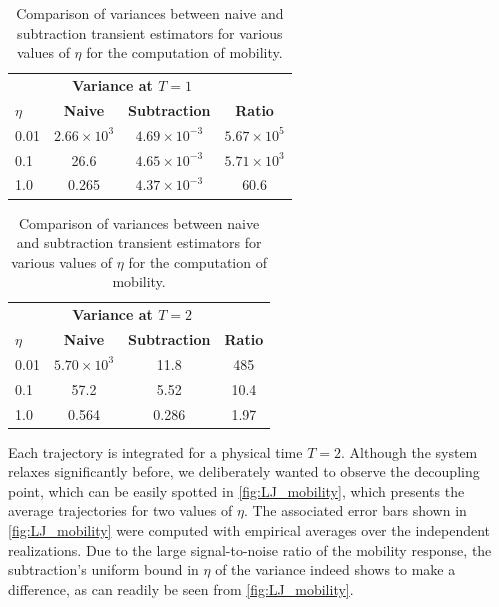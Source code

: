 \documentclass[11pt]{article}
\newcommand\sn[2]{{#1}\times 10^{#2}}
\theoremstyle{definition}
\begin{document}
\begin{table}[h!]
\begin{subtable}[h]{0.45\textwidth}
\centering
\begin{tabular}{lccc}
\toprule
 & \multicolumn{2}{c}{\textbf{Variance at $T=1$}} &  \\
\cmidrule(lr){2-3}
 $\eta$ & \textbf{Naive} & \textbf{Subtraction} & \textbf{Ratio} \\
\midrule
0.01 & $\sn{2.66}{3}$ & $\sn{4.69}{-3}$ & $\sn{5.67}{5}$ \\
0.1  & 26.6   & $\sn{4.65}{-3}$ & $\sn{5.71}{3}$  \\
1.0  & 0.265    & $\sn{4.37}{-3}$ & 60.6    \\
\bottomrule
\end{tabular}
\caption{Data at $T=1$ (start of decoupling)}
\end{subtable}\hfill
\begin{subtable}[h]{0.45\textwidth}
\centering
\begin{tabular}{lccc}
\toprule
 & \multicolumn{2}{c}{\textbf{Variance at $T=2$}} &  \\
\cmidrule(lr){2-3}
 $\eta$ & \textbf{Naive} & \textbf{Subtraction} & \textbf{Ratio} \\
\midrule
0.01 & $\sn{5.70}{3}$ & 11.8 & 485 \\
0.1  & 57.2   & 5.52  & 10.4  \\
1.0  & 0.564    & 0.286  & 1.97   \\
\bottomrule
\end{tabular}
\caption{Data at $T=2$ (total decoupling)}
\end{subtable}
\caption{Comparison of variances between naive and subtraction transient estimators for various values of $\eta$ for the computation of mobility.}
\label{table:LJ_mobility}
\end{table}

Each trajectory is integrated for a physical time $T=2$. Although the system relaxes significantly before, we deliberately wanted to observe the decoupling point, which can be easily spotted in \cref{fig:LJ_mobility}, which presents the average trajectories for two values of $\eta$. The associated error bars shown in \cref{fig:LJ_mobility} were computed with empirical averages over the independent realizations. Due to the large signal-to-noise ratio of the mobility response, the subtraction's uniform bound in $\eta$ of the variance indeed shows to make a difference, as can readily be seen from \cref{fig:LJ_mobility}.
\end{document}
